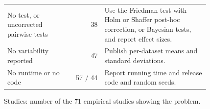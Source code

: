 \begin{table}[t]
\begin{tabular}{@{}p{0.3\linewidth}rp{0.52\linewidth}@{}}
    No test, or uncorrected pairwise tests & 38 & Use the Friedman test with Holm or Shaffer post-hoc correction, or Bayesian tests, and report effect sizes.\\
    No variability reported & 47 & Publish per-dataset means and standard deviations.\\
    No runtime or no code & 57 / 44 & Report running time and release code and random seeds.\\
    \bottomrule
  \end{tabular}
  \par\smallskip\raggedright\scriptsize Studies: number of the 71 empirical studies showing the problem.
\end{table}
